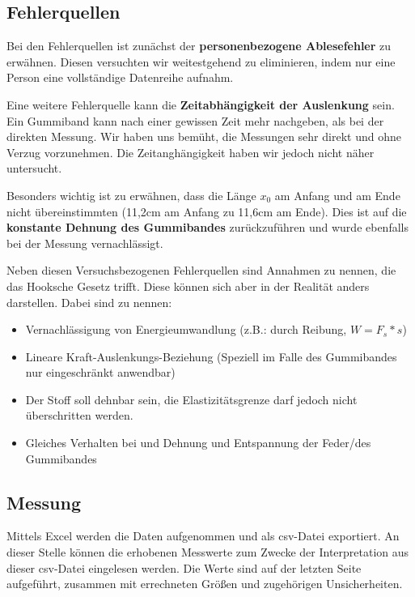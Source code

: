 \documentclass[
]{article}
\providecommand{\tightlist}{%
  \setlength{\itemsep}{0pt}\setlength{\parskip}{0pt}}
\begin{document}
\hypertarget{fehlerquellen}{%
\subsection{Fehlerquellen}\label{fehlerquellen}}

Bei den Fehlerquellen ist zunächst der \textbf{personenbezogene
Ablesefehler} zu erwähnen. Diesen versuchten wir weitestgehend zu
eliminieren, indem nur eine Person eine vollständige Datenreihe aufnahm.

Eine weitere Fehlerquelle kann die \textbf{Zeitabhängigkeit der
Auslenkung} sein. Ein Gummiband kann nach einer gewissen Zeit mehr
nachgeben, als bei der direkten Messung. Wir haben uns bemüht, die
Messungen sehr direkt und ohne Verzug vorzunehmen. Die Zeitanghängigkeit
haben wir jedoch nicht näher untersucht.

Besonders wichtig ist zu erwähnen, dass die Länge \(x_0\) am Anfang und
am Ende nicht übereinstimmten (11,2cm am Anfang zu 11,6cm am Ende). Dies
ist auf die \textbf{konstante Dehnung des Gummibandes} zurückzuführen
und wurde ebenfalls bei der Messung vernachlässigt.

Neben diesen Versuchsbezogenen Fehlerquellen sind Annahmen zu nennen,
die das Hooksche Gesetz trifft. Diese können sich aber in der Realität
anders darstellen. Dabei sind zu nennen:

\begin{itemize}
\tightlist
\item
  Vernachlässigung von Energieumwandlung (z.B.: durch Reibung,
  \(W=F_s*s\))
\item
  Lineare Kraft-Auslenkungs-Beziehung (Speziell im Falle des Gummibandes
  nur eingeschränkt anwendbar)
\item
  Der Stoff soll dehnbar sein, die Elastizitätsgrenze darf jedoch nicht
  überschritten werden.
\item
  Gleiches Verhalten bei und Dehnung und Entspannung der Feder/des
  Gummibandes
\end{itemize}

\hypertarget{messung}{%
\subsection{Messung}\label{messung}}

Mittels Excel werden die Daten aufgenommen und als csv-Datei exportiert.
An dieser Stelle können die erhobenen Messwerte zum Zwecke der
Interpretation aus dieser csv-Datei eingelesen werden. Die Werte sind
auf der letzten Seite aufgeführt, zusammen mit errechneten Größen und
zugehörigen Unsicherheiten.
\end{document}
